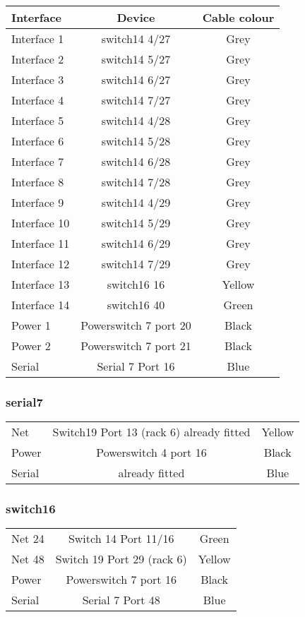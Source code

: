 \begin{table}[H]
\begin{tabular}{|l|c|c|}\hline
Interface & Device & Cable colour \\ \hline
Interface 1 & switch14 4/27 & Grey \\
Interface 2 & switch14 5/27 & Grey \\
Interface 3 & switch14 6/27 & Grey \\
Interface 4 & switch14 7/27 & Grey \\
Interface 5 & switch14 4/28 & Grey \\
Interface 6 & switch14 5/28 & Grey \\
Interface 7 & switch14 6/28 & Grey \\
Interface 8 & switch14 7/28 & Grey \\
Interface 9 & switch14 4/29 & Grey \\
Interface 10 & switch14 5/29 & Grey \\
Interface 11 & switch14 6/29 & Grey \\
Interface 12 & switch14 7/29 & Grey \\
Interface 13 & switch16 16 & Yellow \\
Interface 14 & switch16 40 & Green \\
Power 1 & Powerswitch 7 port 20 & Black \\
Power 2 & Powerswitch 7 port 21 & Black \\
Serial & Serial 7 Port 16 & Blue \\ \hline
\end{tabular}
\end{table}

\subsubsection{serial7}
\begin{table}[H]
\begin{tabular}{|l|c|c|}\hline
Net & Switch19 Port 13 (rack 6) already fitted & Yellow \\
Power & Powerswitch 4 port 16 & Black \\
Serial & already fitted & Blue \\ \hline
\end{tabular}
\end{table}

\subsubsection{switch16}
\begin{table}[H]
\begin{tabular}{|l|c|c|}\hline
Net 24 & Switch 14 Port 11/16 & Green \\
Net 48 & Switch 19 Port 29 (rack 6) & Yellow \\
Power & Powerswitch 7 port 16 & Black \\
Serial & Serial 7 Port 48 & Blue \\ \hline
\end{tabular}
\end{table}

